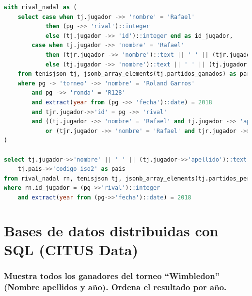 \documentclass[10pt]{opticajnl}
\begin{document}
\begin{lstlisting}[language=SQL]
with rival_nadal as (
	select case when tj.jugador ->> 'nombre' = 'Rafael' 
			then (pg ->> 'rival')::integer  
			else (tj.jugador ->> 'id')::integer end as id_jugador,
		case when tj.jugador ->> 'nombre' = 'Rafael' 
			then (tjr.jugador ->> 'nombre')::text || ' ' || (tjr.jugador ->> 'apellido')::text 
			else (tj.jugador ->> 'nombre')::text || ' ' || (tj.jugador ->> 'apellido')::text end as jugador
	from tenisjson tj, jsonb_array_elements(tj.partidos_ganados) as partidos(pg), tenisjson tjr
    where pg -> 'torneo' ->> 'nombre' = 'Roland Garros' 
    	and pg ->> 'ronda' = 'R128'
		and extract(year from (pg ->> 'fecha')::date) = 2018
        and tjr.jugador->>'id' = pg ->> 'rival'
        and ((tj.jugador ->> 'nombre' = 'Rafael' and tj.jugador ->> 'apellido' = 'Nadal') 
        	or (tjr.jugador ->> 'nombre' = 'Rafael' and tjr.jugador ->> 'apellido' = 'Nadal'))
)

select tj.jugador->>'nombre' || ' ' || (tj.jugador->>'apellido')::text as jugador, 
	tj.pais->>'codigo_iso2' as pais
from rival_nadal rn, tenisjson tj, jsonb_array_elements(tj.partidos_perdidos) as partidos(pg)
where rn.id_jugador = (pg->>'rival')::integer 
	and extract(year from (pg->>'fecha')::date) = 2018
\end{lstlisting}


































\section{Bases de datos distribuidas con SQL (CITUS Data)}

\subsubsection{Muestra todos los ganadores del torneo ``Wimbledon'' (Nombre apellidos y año). Ordena el resultado por año.}
\end{document}
